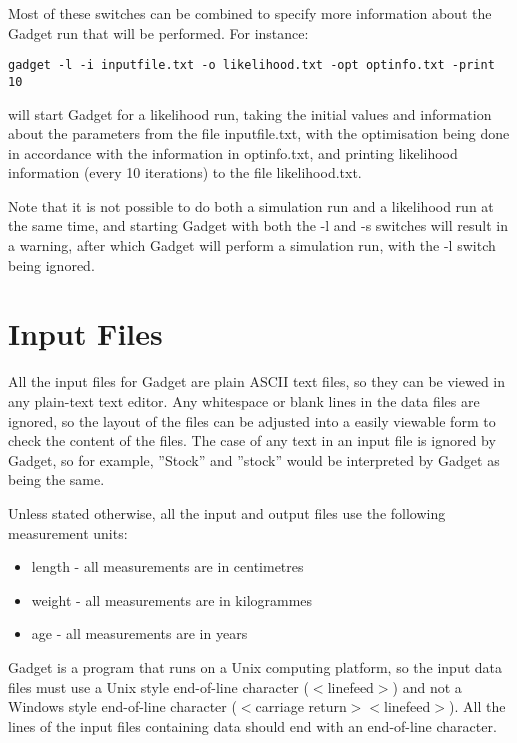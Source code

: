 \documentclass[10pt,twoside]{book}
\begin{document}
\bigskip
Most of these switches can be combined to specify more information about the Gadget run that will be performed.  For instance:

{\small\begin{verbatim}
gadget -l -i inputfile.txt -o likelihood.txt -opt optinfo.txt -print 10
\end{verbatim}}

will start Gadget for a likelihood run, taking the initial values and information about the parameters from the file inputfile.txt, with the optimisation being done in accordance with the information in optinfo.txt, and printing likelihood information (every 10 iterations) to the file likelihood.txt.

\bigskip
Note that it is not possible to do both a simulation run and a likelihood run at the same time, and starting Gadget with both the -l and -s switches will result in a warning, after which Gadget will perform a simulation run, with the -l switch being ignored.

\chapter{Input Files}\label{chap:input}
All the input files for Gadget are plain ASCII text files, so they can be viewed in any plain-text text editor.  Any whitespace or blank lines in the data files are ignored, so the layout of the files can be adjusted into a easily viewable form to check the content of the files.  The case of any text in an input file is ignored by Gadget, so for example, ''Stock'' and ''stock'' would be interpreted by Gadget as being the same.

\bigskip
Unless stated otherwise, all the input and output files use the following measurement units:

\begin{itemize}
\item length - all measurements are in centimetres
\item weight - all measurements are in kilogrammes
\item age - all measurements are in years
\end{itemize}

Gadget is a program that runs on a Unix computing platform, so the input data files must use a Unix style end-of-line character ($<$linefeed$>$) and not a Windows style end-of-line character ($<$carriage return$><$linefeed$>$).  All the lines of the input files containing data should end with an end-of-line character.
\end{document}
